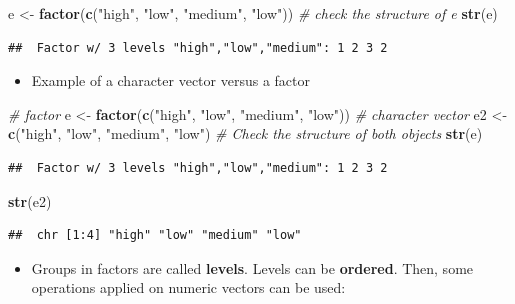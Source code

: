 \documentclass[]{book}
\newenvironment{Shaded}{\begin{snugshade}}{\end{snugshade}}
\newcommand{\CommentTok}[1]{\textcolor[rgb]{0.56,0.35,0.01}{\textit{#1}}}
\newcommand{\KeywordTok}[1]{\textcolor[rgb]{0.13,0.29,0.53}{\textbf{#1}}}
\newcommand{\NormalTok}[1]{#1}
\newcommand{\StringTok}[1]{\textcolor[rgb]{0.31,0.60,0.02}{#1}}
\providecommand{\tightlist}{%
  \setlength{\itemsep}{0pt}\setlength{\parskip}{0pt}}
\begin{document}
\begin{Shaded}
\begin{Highlighting}[]
\NormalTok{e <-}\StringTok{ }\KeywordTok{factor}\NormalTok{(}\KeywordTok{c}\NormalTok{(}\StringTok{"high"}\NormalTok{, }\StringTok{"low"}\NormalTok{, }\StringTok{"medium"}\NormalTok{, }\StringTok{"low"}\NormalTok{))}
\CommentTok{# check the structure of e}
\KeywordTok{str}\NormalTok{(e)}
\end{Highlighting}
\end{Shaded}

\begin{verbatim}
##  Factor w/ 3 levels "high","low","medium": 1 2 3 2
\end{verbatim}

\begin{itemize}
\tightlist
\item
  Example of a character vector versus a factor
\end{itemize}

\begin{Shaded}
\begin{Highlighting}[]
\CommentTok{# factor}
\NormalTok{e <-}\StringTok{ }\KeywordTok{factor}\NormalTok{(}\KeywordTok{c}\NormalTok{(}\StringTok{"high"}\NormalTok{, }\StringTok{"low"}\NormalTok{, }\StringTok{"medium"}\NormalTok{, }\StringTok{"low"}\NormalTok{))}
\CommentTok{# character vector}
\NormalTok{e2 <-}\StringTok{ }\KeywordTok{c}\NormalTok{(}\StringTok{"high"}\NormalTok{, }\StringTok{"low"}\NormalTok{, }\StringTok{"medium"}\NormalTok{, }\StringTok{"low"}\NormalTok{)}
\CommentTok{# Check the structure of both objects}
\KeywordTok{str}\NormalTok{(e)}
\end{Highlighting}
\end{Shaded}

\begin{verbatim}
##  Factor w/ 3 levels "high","low","medium": 1 2 3 2
\end{verbatim}

\begin{Shaded}
\begin{Highlighting}[]
\KeywordTok{str}\NormalTok{(e2)}
\end{Highlighting}
\end{Shaded}

\begin{verbatim}
##  chr [1:4] "high" "low" "medium" "low"
\end{verbatim}

\begin{itemize}
\tightlist
\item
  Groups in factors are called \textbf{levels}.
  Levels can be \textbf{ordered}. Then, some operations applied on numeric vectors can be used:
\end{itemize}
\end{document}
